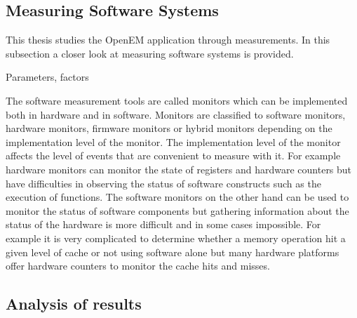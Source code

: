 \subsection{Measuring Software Systems}
\label{subsec:measure}
This thesis studies the OpenEM application through measurements. In this
subsection a closer look at measuring software systems is provided.

Parameters, factors

The software measurement tools are called monitors which can be implemented both
in hardware and in software. Monitors are classified to software monitors,
hardware monitors, firmware monitors or hybrid monitors depending on the
implementation level of the monitor. The implementation level of the monitor
affects the level of events that are convenient to measure with it. For example
hardware monitors can monitor the state of registers and hardware counters but
have difficulties in observing the status of software constructs such as the
execution of functions. The software monitors on the other hand can be used to
monitor the status of software components but gathering information about the
status of the hardware is more difficult and in some cases impossible.
\cite{jain1991art} For example it is very complicated to determine whether a
memory operation hit a given level of cache or not using software alone but many
hardware platforms offer hardware counters to monitor the cache hits and misses.

\subsection{Analysis of results}


